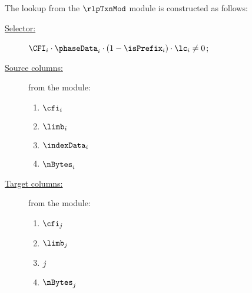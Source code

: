 The lookup from the $\rlpTxnMod$ module is constructed as follows:
\begin{description}
	\item[\underline{Selector:}] $\CFI_{i} \cdot \phaseData_{i} \cdot (1 - \isPrefix_{i}) \cdot \lc_{i} \neq 0$;
	\item[\underline{Source columns:}] from the \rlpTxnMod{} module:
	\begin{multicols}{3}
	\begin{enumerate}
		\item $\cfi_{i}$
		\item $\limb_{i}$
		\item $\indexData_{i}$
		\item $\nBytes_{i}$
	\end{enumerate}
	\end{multicols}
\item[\underline{Target columns:}] from the \romMod{} module: 
	\begin{multicols}{3}
	\begin{enumerate}
		\item $\cfi_{j}$
		\item $\limb_{j}$
		\item $\index_{j}$
		\item $\nBytes_{j}$
	\end{enumerate} 
	\end{multicols}
\end{description}

